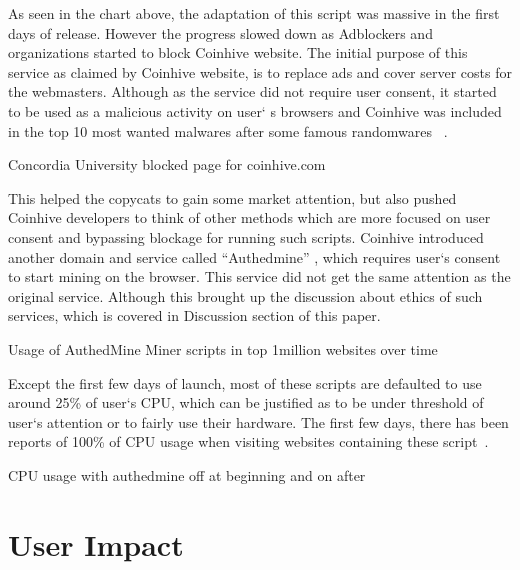 As seen in the chart above, the adaptation of this script was massive in the first days of release. However the progress slowed down as Adblockers and organizations started to block Coinhive website. The initial purpose of this service as claimed by Coinhive website, is to replace ads and cover server costs for the webmasters. Although as the service did not require user consent, it started to be used as a malicious activity on user` s browsers and Coinhive was included in the top 10 most wanted malwares after some famous randomwares ~\cite{checkpoint}. 

\begin{center}
	\caption{Concordia University blocked page for coinhive.com}
\end{center}

This helped the copycats to gain some market attention, but also pushed Coinhive developers to think of other methods which are more focused on user consent and bypassing blockage for running such scripts. Coinhive introduced another domain and service called ``Authedmine'' , which requires user`s consent to start mining on the browser. This service did not get the same attention as the original service. Although this brought up the discussion about ethics of such services, which is covered in Discussion section of this paper. 

\begin{center}
	\caption{Usage of AuthedMine Miner scripts in top 1million websites over time}
\end{center}

Except the first few days of launch, most of these scripts are defaulted to use around 25\% of user`s CPU, which can be justified as to be under threshold of user`s attention or to fairly use their hardware. The first few days, there has been reports of 100\% of CPU usage when visiting websites containing these script~\cite{piratesbayblog}.

\begin{center}
	\caption{CPU usage with authedmine off at beginning and on after}
\end{center}


\section{User Impact}

